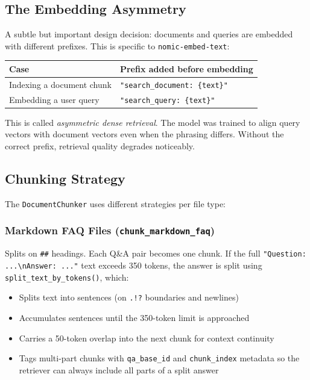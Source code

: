 \documentclass[12pt,letterpaper]{article}
\begin{document}
\subsection{The Embedding Asymmetry}

A subtle but important design decision: documents and queries are embedded with
different prefixes. This is specific to \texttt{nomic-embed-text}:

\begin{center}
\begin{tabular}{ll}
\toprule
\textbf{Case} & \textbf{Prefix added before embedding} \\
\midrule
Indexing a document chunk & \texttt{"search\_document: \{text\}"} \\
Embedding a user query & \texttt{"search\_query: \{text\}"} \\
\bottomrule
\end{tabular}
\end{center}

This is called \emph{asymmetric dense retrieval}. The model was trained to align
query vectors with document vectors even when the phrasing differs. Without the
correct prefix, retrieval quality degrades noticeably.

\subsection{Chunking Strategy}

The \texttt{DocumentChunker} uses different strategies per file type:

\subsubsection{Markdown FAQ Files (\texttt{chunk\_markdown\_faq})}

Splits on \texttt{\#\#} headings. Each Q\&A pair becomes one chunk. If the full
\texttt{"Question: ...\textbackslash nAnswer: ..."} text exceeds 350 tokens, the
answer is split using \texttt{split\_text\_by\_tokens()}, which:
\begin{itemize}[leftmargin=2em]
  \item Splits text into sentences (on \texttt{.!?} boundaries and newlines)
  \item Accumulates sentences until the 350-token limit is approached
  \item Carries a 50-token overlap into the next chunk for context continuity
  \item Tags multi-part chunks with \texttt{qa\_base\_id} and \texttt{chunk\_index}
        metadata so the retriever can always include all parts of a split answer
\end{itemize}
\end{document}
